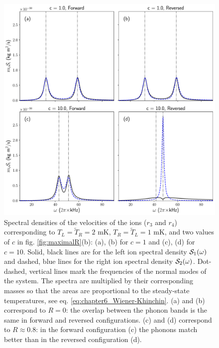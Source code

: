\begin{figure}[t]
  \center
  \includegraphics[width=0.85\linewidth]{Figures/SpectrumComparative.pdf}
  \caption{Spectral densities of the velocities of the ions ($r_3$ and $r_4$) corresponding to $T_L=\tilde{T}_R=2$ mK, $T_R=\tilde{T}_L=1$ mK, and  two values of $c$ in fig. \ref{fig:maximalR}(b): (a), (b) for $c=1$ and (c), (d) for $c=10$. Solid, black lines are for the left ion spectral density ${\cal{S}}_1(\omega)$ and dashed, blue lines for the right ion spectral density
 ${\cal{S}}_2(\omega)$. Dot-dashed, vertical lines mark the frequencies of the normal modes of the system. The spectra are multiplied by their corresponding masses so that  the areas are proportional to the steady-state temperatures, see  eq. \eqref{eq:chapter6_Wiener-Khinchin}. (a) and (b) correspond to $R = 0$:  the overlap between the phonon bands is the same in forward and reversed configurations. (c) and (d) correspond to $R\approx 0.8$:  in the forward configuration (c)  the phonons match better than in the reversed configuration (d).}
  \label{fig:Figure_Spectra}
\end{figure}

